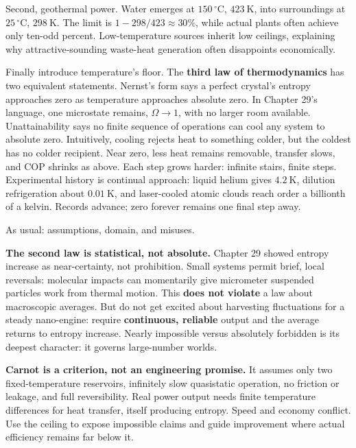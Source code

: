 Second, geothermal power. Water emerges at \(150\,^\circ\mathrm{C}\), \(423\ \mathrm{K}\), into surroundings at \(25\,^\circ\mathrm{C}\), \(298\ \mathrm{K}\). The limit is \(1-298/423\approx 30\%\), while actual plants often achieve only ten-odd percent. Low-temperature sources inherit low ceilings, explaining why attractive-sounding waste-heat generation often disappoints economically.

Finally introduce temperature's floor. The \textbf{third law of thermodynamics} has two equivalent statements. Nernst's form says a perfect crystal's entropy approaches zero as temperature approaches absolute zero. In Chapter 29's language, one microstate remains, \(\Omega\to1\), with no larger room available. Unattainability says no finite sequence of operations can cool any system to absolute zero. Intuitively, cooling rejects heat to something colder, but the coldest has no colder recipient. Near zero, less heat remains removable, transfer slows, and COP shrinks as above. Each step grows harder: infinite stairs, finite steps. Experimental history is continual approach: liquid helium gives \(4.2\ \mathrm{K}\), dilution refrigeration about \(0.01\ \mathrm{K}\), and laser-cooled atomic clouds reach order a billionth of a kelvin. Records advance; zero forever remains one final step away.


As usual: assumptions, domain, and misuses.

\textbf{The second law is statistical, not absolute.} Chapter 29 showed entropy increase as near-certainty, not prohibition. Small systems permit brief, local reversals: molecular impacts can momentarily give micrometer suspended particles work from thermal motion. This \textbf{does not violate} a law about macroscopic averages. But do not get excited about harvesting fluctuations for a steady nano-engine: require \textbf{continuous, reliable} output and the average returns to entropy increase. Nearly impossible versus absolutely forbidden is its deepest character: it governs large-number worlds.

\textbf{Carnot is a criterion, not an engineering promise.} It assumes only two fixed-temperature reservoirs, infinitely slow quasistatic operation, no friction or leakage, and full reversibility. Real power output needs finite temperature differences for heat transfer, itself producing entropy. Speed and economy conflict. Use the ceiling to expose impossible claims and guide improvement where actual efficiency remains far below it.

